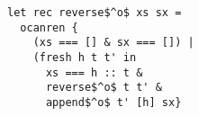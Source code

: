 \begin{lstlisting}
let rec reverse$^o$ xs sx =
  ocanren {
    (xs === [] & sx === []) |
    (fresh h t t' in
      xs === h :: t &
      reverse$^o$ t t' &
      append$^o$ t' [h] sx}
  \end{lstlisting}